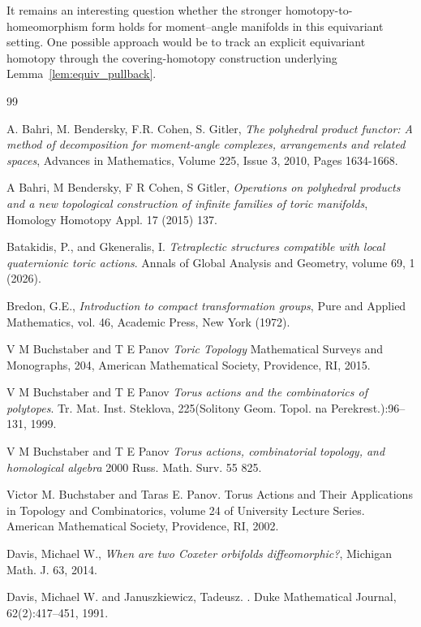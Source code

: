 \documentclass[11pt,a4paper]{article}
\numberwithin{equation}{section}
\theoremstyle{named}
\begin{document}
It remains an interesting question whether the stronger homotopy-to-homeomorphism form holds for moment--angle manifolds in this equivariant setting. One possible approach would be to track an explicit equivariant homotopy through the covering-homotopy construction underlying Lemma~\ref{lem:equiv_pullback}.

\begin{thebibliography}{99}

A. Bahri, M. Bendersky, F.R. Cohen, S. Gitler, \emph{The polyhedral product functor: A method of decomposition for moment-angle complexes, arrangements and related spaces}, Advances in Mathematics, Volume 225, Issue 3, 2010, Pages 1634-1668.

A Bahri, M Bendersky, F R Cohen, S Gitler, \emph{Operations on polyhedral products and a new topological construction of infinite families of toric manifolds}, Homology Homotopy Appl. 17 (2015) 137.

Batakidis, P., and Gkeneralis, I.
\newblock \emph{Tetraplectic structures compatible with local quaternionic toric actions}. Annals of Global Analysis and Geometry, volume 69, 1 (2026).

 Bredon, G.E., \emph{Introduction to compact transformation groups}, Pure and Applied Mathematics, vol. 46, Academic Press, New York (1972).

V M Buchstaber and T E Panov {\em Toric Topology} Mathematical Surveys and Monographs, 204, American Mathematical Society, Providence, RI, 2015.

V M Buchstaber and T E Panov \emph{Torus actions and the combinatorics of polytopes}. Tr. Mat. Inst. Steklova, 225(Solitony Geom. Topol. na Perekrest.):96–131, 1999.

V M Buchstaber and T E Panov \emph{Torus actions, combinatorial topology, and homological algebra} 2000 Russ. Math. Surv. 55 825.

Victor M. Buchstaber and Taras E. Panov. Torus Actions and Their Applications in Topology and Combinatorics, volume 24 of University Lecture Series. American Mathematical Society, Providence, RI, 2002.

Davis, Michael W., \emph{When are two Coxeter orbifolds diffeomorphic?}, Michigan Math. J. 63, 2014.

Davis, Michael W. and Januszkiewicz, Tadeusz.
.
\newblock Duke Mathematical Journal, 62(2):417--451, 1991.


\end{thebibliography}
\end{document}
